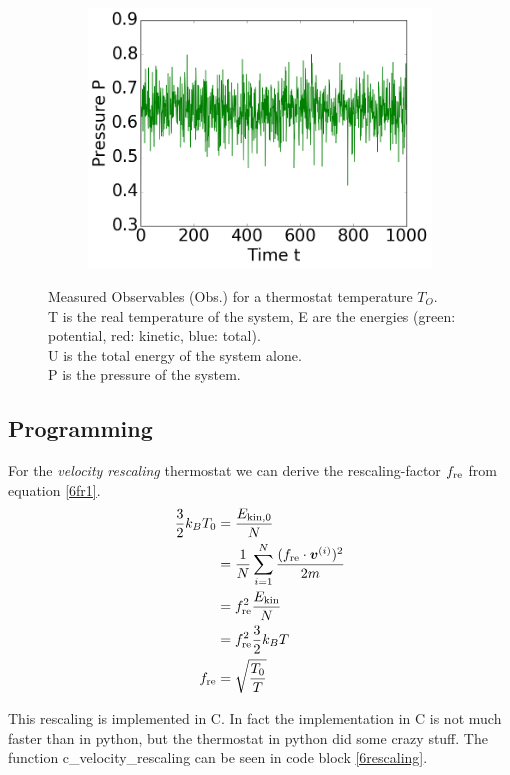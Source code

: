 \begin{figure}[ht]
\begin{subfigure}{0.3\textwidth}
\includegraphics[width=\textwidth]{../dat/Pressure_T2d0.png}
\end{subfigure}

\caption{
Measured Observables (Obs.) for a thermostat temperature $T_O$.\\
T is the real temperature of the system, E are the energies (green: potential, red: kinetic, blue: total).\\
U is the total energy of the system alone.\\
P is the pressure of the system.}
\label{fig4}
\end{figure}

\subsection*{Programming}

For the \emph{velocity rescaling} thermostat we can derive the rescaling-factor $f_\text{re}$ from equation \eqref{6fr1}.
\begin{align}
\frac{3}{2}k_BT_0
	&= \frac{E_{\text{kin},0}}{N}
	\label{6fr1}\\
&= \frac{1}{N}\sum_{i=1}^{N} \frac{(f_\text{re}\cdot\boldsymbol{v}^{(i)})^2}{2m}
	\label{6fr2}\\
&= f_\text{re}^2\frac{E_\text{kin}}{N}
	\label{6fr3}\\
&=f_\text{re}^2\frac{3}{2}k_BT
	\label{6fr4}\\
f_\text{re}
	&= \sqrt{\frac{T_0}{T}}
	\label{6r5}
\end{align}

This rescaling is implemented in C. In fact the implementation in C is not much faster than in python, but the thermostat in python did some crazy stuff.
The function c\_velocity\_rescaling can be seen in code block \ref{6rescaling}.\\
\ \\

